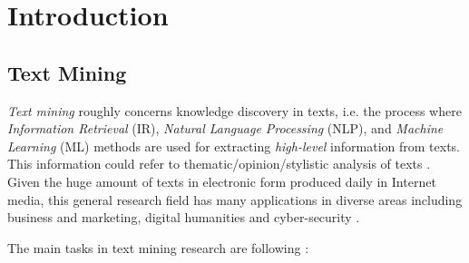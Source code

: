 
\chapter{Introduction}

\label{chap:introduction}


\newcommand{\keyword}[1]{\textbf{#1}}
\newcommand{\tabhead}[1]{\textbf{#1}}
\newcommand{\code}[1]{\texttt{#1}}
\newcommand{\file}[1]{\texttt{\bfseries#1}}
\newcommand{\option}[1]{\texttt{\itshape#1}}


\section{Text Mining} \label{chap:introduction:sec:text_mining}

\textit{Text mining} roughly concerns knowledge discovery in texts, i.e. the process where \textit{Information Retrieval} (IR), \textit{Natural Language Processing} (NLP), and \textit{Machine Learning} (ML) methods are used for extracting \textit{high-level} information from texts. This information could refer to thematic/opinion/stylistic analysis of texts \parencite{hotho2005}. Given the huge amount of texts in electronic form produced daily in Internet media, this general research field has many applications in diverse areas including business and marketing, digital humanities and cyber-security \parencite{Weiss2010}. 

The main tasks in text mining research are following \parencite{Aggarwal2012}:

